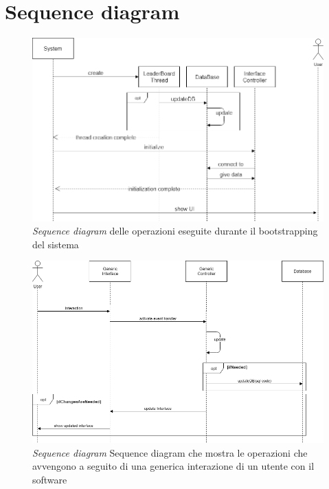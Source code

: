 \documentclass[a4paper,12pt,titlepage]{article}
\begin{document}
{{{\section{Sequence diagram}\label{sec:sequencediagram}
\begin{figure}[H]
		\centering
		\includegraphics[scale=0.5]{sequenceDiagramBootPhase}
		\caption{\textit{Sequence diagram} delle operazioni eseguite durante il bootstrapping del sistema}
\end{figure}
\begin{figure}[H]
		\centering
		\includegraphics[scale=0.5]{sequenceDiagramGenericInteraction}
		\caption{\textit{Sequence diagram} Sequence diagram che mostra le operazioni che avvengono a seguito di una generica interazione di un utente con il software}
\end{figure}
\begin{figure}[H]
		\centering

\end{figure}}}}
\end{document}
